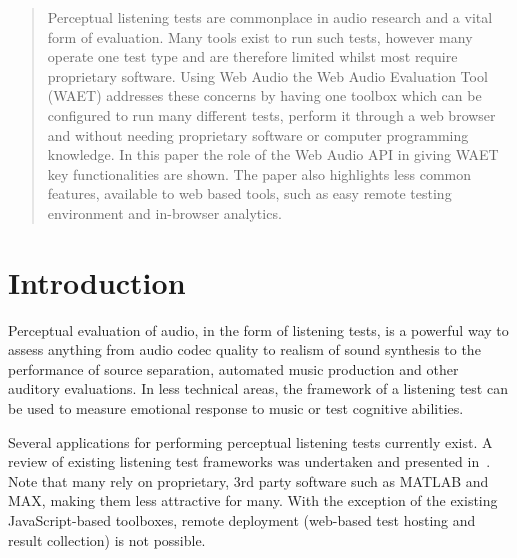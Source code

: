 \documentclass{sig-alternate}
\begin{document}
\maketitle
\begin{abstract}

Perceptual listening tests are commonplace in audio research and a vital form of evaluation. Many tools exist to run such tests, however many operate one test type and are therefore limited whilst most require proprietary software. Using Web Audio the Web Audio Evaluation Tool (WAET) addresses these concerns by having one toolbox which can be configured to run many different tests, perform it through a web browser and without needing proprietary software or computer programming knowledge. In this paper the role of the Web Audio API in giving WAET key functionalities are shown. The paper also highlights less common features, available to web based tools, such as easy remote testing environment and in-browser analytics.

\end{abstract}


\section{Introduction}

	Perceptual evaluation of audio, in the form of listening tests, is a powerful way to assess anything from audio codec quality to realism of sound synthesis to the performance of source separation, automated music production and other auditory evaluations.
	In less technical areas, the framework of a listening test can be used to measure emotional response to music or test cognitive abilities. 


	Several applications for performing perceptual listening tests currently exist. A review of existing listening test frameworks was undertaken and presented in~. Note that many rely on proprietary, 3rd party software such as MATLAB and MAX, making them less attractive for many. With the exception of the existing JavaScript-based toolboxes, remote deployment (web-based test hosting and result collection) is not possible. 
	
\end{document}
